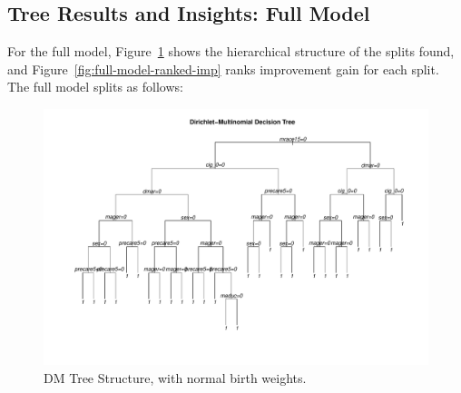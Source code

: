 \subsection{Tree Results and Insights: Full Model}
\label{sec:ch3-results}
For the full model, Figure~\ref{fig:tree} shows the hierarchical structure of the splits found, and Figure~\ref{fig:full-model-ranked-imp} ranks improvement gain for each split. The full model splits as follows:
\begin{figure}[H]
  \centering
  \includegraphics[width=1\textwidth]{chapters/chapter3/figures/dm_tree2021.pdf}
  \caption{DM Tree Structure, with normal birth weights.}
  \label{fig:tree}
\end{figure}
